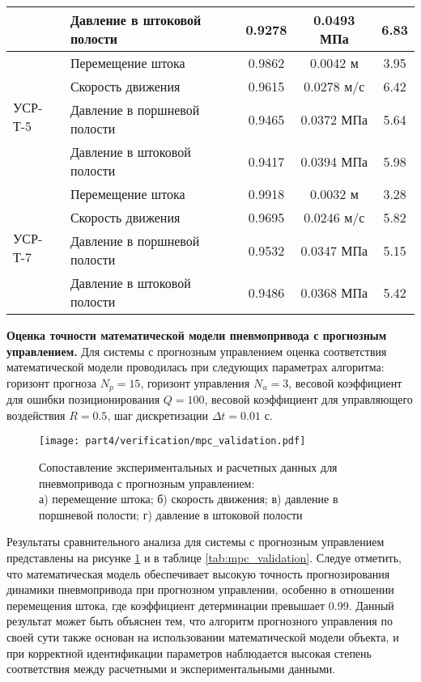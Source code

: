 \begin{table}[h]
\begin{tabular}{llccc}
		                         & Давление в штоковой полости  & \num{0.9278} & \num{0.0493} МПа & \num{6.83}   \\
		\hline
		\multirow{4}{*}{УСР-Т-5} & Перемещение штока            & \num{0.9862} & \num{0.0042} м   & \num{3.95}   \\
		                         & Скорость движения            & \num{0.9615} & \num{0.0278} м/с & \num{6.42}   \\
		                         & Давление в поршневой полости & \num{0.9465} & \num{0.0372} МПа & \num{5.64}   \\
		                         & Давление в штоковой полости  & \num{0.9417} & \num{0.0394} МПа & \num{5.98}   \\
		\hline
		\multirow{4}{*}{УСР-Т-7} & Перемещение штока            & \num{0.9918} & \num{0.0032} м   & \num{3.28}   \\
		                         & Скорость движения            & \num{0.9695} & \num{0.0246} м/с & \num{5.82}   \\
		                         & Давление в поршневой полости & \num{0.9532} & \num{0.0347} МПа & \num{5.15}   \\
		                         & Давление в штоковой полости  & \num{0.9486} & \num{0.0368} МПа & \num{5.42}   \\
		\hline
	\end{tabular}
\end{table}

\textbf{Оценка точности математической модели пневмопривода с прогнозным управлением.}
Для системы с прогнозным управлением оценка соответствия математической
модели проводилась при следующих параметрах алгоритма: горизонт прогноза $N_p = 15$,
горизонт управления $N_u = 3$, весовой коэффициент для ошибки позиционирования $Q = 100$,
весовой коэффициент для управляющего воздействия $R = \num{0.5}$, шаг дискретизации $\Delta t = \num{0.01}$ с.

\begin{figure}[h]
	\centering
	\texttt{[image: part4/verification/mpc\_validation.pdf]}
	\caption{Сопоставление экспериментальных и расчетных данных для пневмопривода с прогнозным управлением:\\
		а) перемещение штока; б) скорость движения; в) давление в поршневой полости; г) давление в штоковой полости}
	\label{fig:mpc_validation}
\end{figure}

Результаты сравнительного анализа для системы с прогнозным управлением представлены
на рисунке \ref{fig:mpc_validation} и в таблице \ref{tab:mpc_validation}. Следуе
отметить, что математическая модель обеспечивает высокую точность
прогнозирования динамики пневмопривода при прогнозном управлении,
особенно в отношении перемещения штока, где коэффициент детерминации
превышает 0.99. Данный результат может быть объяснен тем, что алгоритм прогнозного
управления по своей сути также основан на использовании математической модели объекта,
и при корректной идентификации параметров наблюдается высокая степень соответствия между
расчетными и экспериментальными данными.

